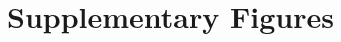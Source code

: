 \documentclass{article}
\newcommand{\good}[1]{\textcolor{green!50!black}{#1}}
\begin{document}





\newpage

\section{Supplementary Figures}
\end{document}
